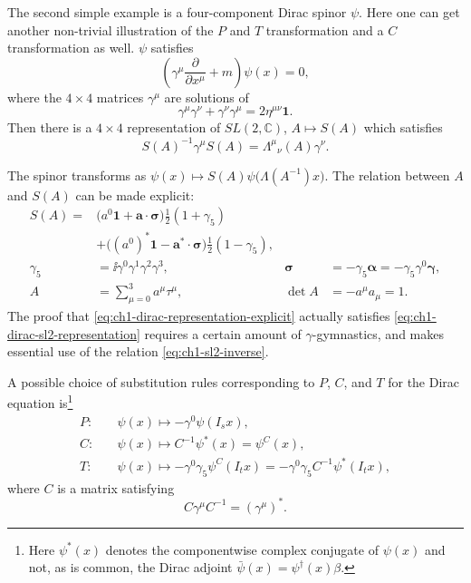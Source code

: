 The second simple example is a four-component Dirac spinor $\psi$. Here one
can get another non-trivial illustration of the $P$ and $T$ transformation and
a $C$ transformation as well. $\psi$ satisfies
\begin{equation}
  \left(\gamma^\mu\frac{\partial}{\partial x^\mu}+m\right)\psi(x)=0,
  \tag{1-41}\label{eq:ch1-dirac-equation}
\end{equation}
where the $4\times4$ matrices $\gamma^\mu$ are solutions of
\begin{equation}
  \gamma^\mu\gamma^\nu+\gamma^\nu\gamma^\mu=2\eta^{\mu\nu}\mathbf{1}.
  \tag{1-42}\label{eq:ch1-clifford-algebra}
\end{equation}
Then there is a $4\times4$ representation of $SL(2,\mathbb C)$,
$A\longmapsto S(A)$ which satisfies
\begin{equation}
  S(A)^{-1}\gamma^\mu S(A)
  =\Lambda^\mu{}_\nu(A)\gamma^\nu .
  \tag{1-43}\label{eq:ch1-dirac-sl2-representation}
\end{equation}

The spinor transforms as
$\psi(x)\longmapsto S(A)\psi\bigl(\Lambda(A^{-1})x\bigr)$. The
relation between $A$ and $S(A)$ can be made explicit:
\begin{equation}
\begin{aligned}
  S(A)={}&
  \bigl(a^0\mathbf{1}+\mathbf{a}\mathbin{\cdot}\boldsymbol{\sigma}\bigr)
  \frac12(1+\gamma_5)\\[-2pt]
  &+\bigl((a^0)^*\mathbf{1}
    -\mathbf{a}^*\mathbin{\cdot}\boldsymbol{\sigma}\bigr)
  \frac12(1-\gamma_5),\\
  \gamma_5&=\ii\gamma^0\gamma^1\gamma^2\gamma^3, &
  \boldsymbol{\sigma}&
  =-\gamma_5\boldsymbol{\alpha}
  =-\gamma_5\gamma^0\boldsymbol{\gamma},\\
  A&=\sum_{\mu=0}^3a^\mu\tau^\mu, &
  \det A&=-a^\mu a_\mu=1 .
\end{aligned}
\tag{1-44}\label{eq:ch1-dirac-representation-explicit}
\end{equation}
The proof that \eqref{eq:ch1-dirac-representation-explicit} actually satisfies \eqref{eq:ch1-dirac-sl2-representation} requires a certain amount of
$\gamma$-gymnastics, and makes essential use of the relation \eqref{eq:ch1-sl2-inverse}.

A possible choice of substitution rules corresponding to $P$, $C$, and $T$ for
the Dirac equation is\footnote{Here $\psi^*(x)$ denotes the componentwise
complex conjugate of $\psi(x)$ and not, as is common, the Dirac adjoint
$\bar\psi(x)=\psi^\dagger(x)\beta$.}
\begin{equation}
\begin{aligned}
  P:\quad&\psi(x)\longmapsto-\gamma^0\psi(I_sx),\\
  C:\quad&\psi(x)\longmapsto C^{-1}\psi^*(x)=\psi^C(x),\\
  T:\quad&\psi(x)\longmapsto-\gamma^0\gamma_5\psi^C(I_tx)
    =-\gamma^0\gamma_5 C^{-1}\psi^*(I_tx),
\end{aligned}
\tag{1-45}\label{eq:ch1-dirac-pct-rules}
\end{equation}
where $C$ is a matrix satisfying
\[
  C\gamma^\mu C^{-1}=(\gamma^\mu)^* .
\]

